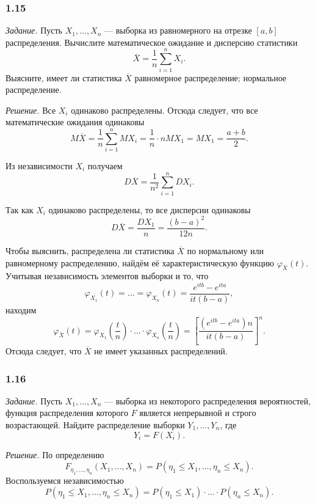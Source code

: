 \subsubsection*{1.15}

\textit{Задание.}
Пусть $X_1, \dotsc, X_n$ ---
выборка из равномерного на отрезке $ \left[ a, b \right] $ распределения.
Вычислите математическое ожидание и дисперсию статистики
$$ \overline{X} =
  \frac{1}{n} \sum \limits_{i = 1}^n X_i.$$
Выясните, имеет ли статистика $ \overline{X}$ равномерное распределение; нормальное распределение.

\textit{Решение.} Все $X_i$ одинаково распределены.
Отсюда следует, что все математические ожидания одинаковы
$$M \overline{X} =
  \frac{1}{n} \sum \limits_{i = 1}^n MX_i =
  \frac{1}{n} \cdot nMX_1 =
  MX_1 =
  \frac{a+b}{2}.$$

Из независимости $X_i$ получаем
$$D \overline{X} =
  \frac{1}{n^2} \sum \limits_{i = 1}^n DX_i.$$

Так как $X_i$ одинаково распределены, то все дисперсии одинаковы
$$D \overline{X} =
  \frac{DX_1}{n} =
  \frac{ \left( b - a \right)^2}{12n}.$$

Чтобы выяснить,
распределена ли статистика $ \overline{X}$ по нормальному или равномерному распределению,
найдём её характеристическую функцию $ \varphi_{ \overline{X}} \left( t \right) $.
Учитывая независимость элементов выборки и то, что
$$ \varphi_{X_1} \left( t \right) =
  \dotsc =
  \varphi_{X_n} \left( t \right) =
  \frac{e^{itb} - e^{ita}}{it \left( b - a \right) },$$
находим
$$ \varphi_{ \overline{X}} \left( t \right) =
  \varphi_{X_1} \left( \frac{t}{n} \right) \cdot
  \dotsc \cdot
  \varphi_{X_n} \left( \frac{t}{n} \right) =
  \left[ \frac{\left( e^{itb} - e^{ita} \right) n}{it \left( b - a \right)} \right]^n.$$
Отсюда следует, что $ \overline{X}$ не имеет указанных распределений.

\subsubsection*{1.16}

\textit{Задание.}
Пусть $X_1, \dotsc, X_n$ --- выборка из некоторого распределения вероятностей,
функция распределения которого $F$ является непрерывной и строго возрастающей.
Найдите распределение выборки $Y_1, \dotsc, Y_n$, где
$$Y_i =
  F \left( X_i \right).$$

\textit{Решение.}
По определению
$$F_{ \eta_1, \dotsc, \eta_n} \left( X_1, \dotsc, X_n \right) =
  P \left( \eta_1 \leq X_1, \dotsc, \eta_n \leq X_n \right).$$
Воспользуемся независимостью
$$P \left( \eta_1 \leq X_1, \dotsc, \eta_n \leq X_n \right) =
  P \left( \eta_1 \leq X_1 \right) \cdot \dotsc \cdot P \left( \eta_n \leq X_n \right).$$

